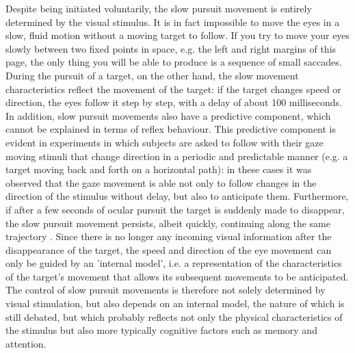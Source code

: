 \documentclass[11pt]{article}
\begin{document}
Despite being initiated voluntarily, the slow pursuit movement is entirely determined by the visual stimulus. It is in fact impossible to move the eyes in a slow, fluid motion without a moving target to follow. If you try to move your eyes slowly between two fixed points in space, e.g. the left and right margins of this page, the only thing you will be able to produce is a sequence of small saccades. During the pursuit of a target, on the other hand, the slow movement characteristics reflect the movement of the target: if the target changes speed or direction, the eyes follow it step by step, with a delay of about 100 milliseconds. In addition, slow pursuit movements also have a predictive component, which cannot be explained in terms of reflex behaviour. This predictive component is evident in experiments in which subjects are asked to follow with their gaze moving stimuli that change direction in a periodic and predictable manner (e.g. a target moving back and forth on a horizontal path): in these cases it was observed that the gaze movement is able not only to follow changes in the direction of the stimulus without delay, but also to anticipate them. Furthermore, if after a few seconds of ocular pursuit the target is suddenly made to disappear, the slow pursuit movement persists, albeit quickly, continuing along the same trajectory \cite{Whittaker1982}. Since there is no longer any incoming visual information after the disappearance of the target, the speed and direction of the eye movement can only be guided by an 'internal model', i.e. a representation of the characteristics of the target's movement that allows its subsequent movements to be anticipated. The control of slow pursuit movements is therefore not solely determined by visual stimulation, but also depends on an internal model, the nature of which is still debated, but which probably reflects not only the physical characteristics of the stimulus but also more typically cognitive factors such as memory and attention.
\end{document}
